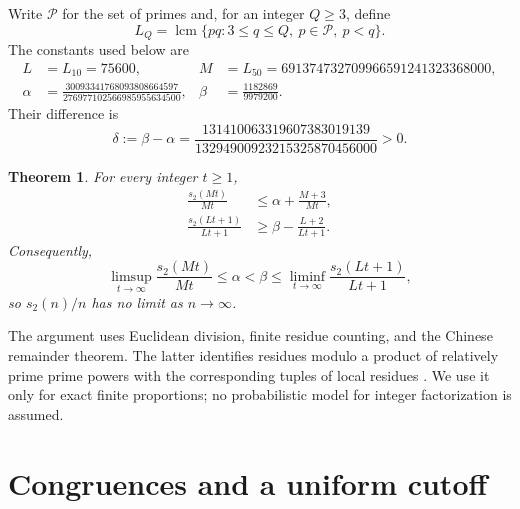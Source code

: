 \documentclass[11pt]{article}
\newtheorem{theorem}{Theorem}
\newcommand{\PP}{\mathcal P}
\DeclareMathOperator{\lcm}{lcm}
\begin{document}
Write $\PP$ for the set of primes and, for an integer $Q\ge3$, define
\begin{equation}\label{eq:period}
 L_Q=\lcm\{pq:3\le q\le Q,\ p\in\PP,\ p<q\}.
\end{equation}
The constants used below are
\begin{align*}
 L&=L_{10}=75600, &
 M&=L_{50}=691374732709966591241323368000,\\
 \alpha&=\frac{30093341768093808664597}{276977102566985955634500}, &
 \beta&=\frac{1182869}{9979200}.
\end{align*}
Their difference is
\begin{equation}\label{eq:delta}
 \delta:=\beta-\alpha
 =\frac{131410063319607383019139}{13294900923215325870456000}>0.
\end{equation}

\begin{theorem}\label{thm:main}
For every integer $t\ge1$,
\begin{align}
 \frac{s_2(Mt)}{Mt}&\le\alpha+\frac{M+3}{Mt},\label{eq:upper}\\
 \frac{s_2(Lt+1)}{Lt+1}&\ge\beta-\frac{L+2}{Lt+1}.\label{eq:lower}
\end{align}
Consequently,
\begin{equation}\label{eq:separation}
 \limsup_{t\to\infty}\frac{s_2(Mt)}{Mt}
 \le\alpha<\beta\le
 \liminf_{t\to\infty}\frac{s_2(Lt+1)}{Lt+1},
\end{equation}
so $s_2(n)/n$ has no limit as $n\to\infty$.
\end{theorem}

The argument uses Euclidean division, finite residue counting, and the
Chinese remainder theorem. The latter identifies residues modulo a
product of relatively prime prime powers with the corresponding tuples
of local residues \cite[Theorem 2.6]{Shoup2009}. We use it only for
exact finite proportions; no probabilistic model for integer
factorization is assumed.

\section{Congruences and a uniform cutoff}
\end{document}
